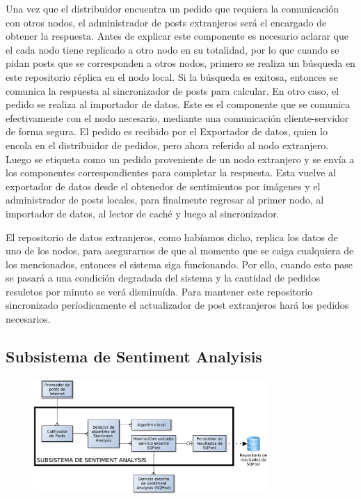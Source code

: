 Una vez que el distribuidor encuentra un pedido que requiera la comunicación con otros nodos, el administrador de posts extranjeros será el encargado de obtener la respuesta. Antes de explicar este componente es necesario aclarar que el cada nodo tiene replicado a otro nodo en su totalidad, por lo que cuando se pidan posts que se corresponden a otros nodos, primero se realiza un búsqueda en este repositorio réplica en el nodo local. Si la búsqueda es exitosa, entonces se comunica la respuesta al sincronizador de posts para calcular. En otro caso, el pedido se realiza al importador de datos. Este es el componente que se comunica efectivamente con el nodo necesario, mediante una comunicación cliente-servidor de forma segura. El pedido es recibido por el Exportador de datos, quien lo encola en el distribuidor de pedidos, pero ahora referido al nodo extranjero. Luego se etiqueta como un pedido proveniente de un nodo extranjero y se envía a los componentes correspondientes para completar la respuesta. Esta vuelve al exportador de datos desde el obtenedor de sentimientos por imágenes y el administrador de posts locales, para finalmente regresar al primer nodo, al importador de datos, al lector de caché y luego al sincronizador.


El repositorio de datos extranjeros, como habíamos dicho, replica los datos de uno de los nodos, para asegurarnos de que al momento que se caiga cualquiera de los mencionados, entonces el sistema siga funcionando. Por ello, cuando esto pase se pasará a una condición degradada del sistema y la cantidad de pedidos resuletos por minuto se verá disminuída. Para mantener este repositorio sincronizado períodicamente el actualizador de post extranjeros hará los pedidos necesarios.

\subsection{Subsistema de Sentiment Analyisis}

\begin{figure}[H]
\centering
\includegraphics[width=0.8\textwidth]{graph/subsistemaSentimentAnalysis.pdf}
\end{figure}

